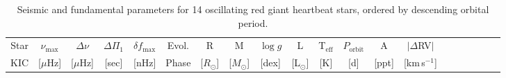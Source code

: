\begin{landscape}
\begin{table}[tp!]
\caption{
Seismic and fundamental parameters for 14 oscillating red giant heartbeat stars, ordered by descending orbital period.}
\tabcolsep=5pt
\hfill\begin{tabular}{c|rrrrrrrrrrrrrrrrrrr}
\hline \hline
\multicolumn{1}{c}{Star}  & \multicolumn{1}{c}{$\nu_{\mathrm{max}}$}  & 
\multicolumn{1}{c}{$\Delta\nu$}  & \multicolumn{1}{c}{$\Delta\Pi_1$}  & 
\multicolumn{1}{c}{$\delta f_{\mathrm{max}}$} &  \multicolumn{1}{c}{Evol.}  & 
\multicolumn{1}{c}{R}  & 
\multicolumn{1}{c}{M}  & 
\multicolumn{1}{c}{$\log g$} & 
\multicolumn{1}{c}{L}  & 
\multicolumn{1}{c}{T$_{\mathrm{eff}}$} & 
\multicolumn{1}{c}{$P_{\mathrm{orbit}}$} & 
\multicolumn{1}{c}{A}  & 
\multicolumn{1}{c}{$| \Delta $RV$|$} 	 \\
\multicolumn{1}{c}{KIC}  & 
\multicolumn{1}{c}{ [$\mu$Hz]} & 
\multicolumn{1}{c}{ [$\mu$Hz]} & 
\multicolumn{1}{c}{ [sec]} & 
\multicolumn{1}{c}{ [nHz]} & 
\multicolumn{1}{c}{Phase}  & 
\multicolumn{1}{c}{ [$R_\odot$]} & 
\multicolumn{1}{c}{ [$M_\odot$]} & 
\multicolumn{1}{c}{ [dex]} & 
\multicolumn{1}{c}{ [L$_\odot$]} & 
\multicolumn{1}{c}{ [K]} & 
\multicolumn{1}{c}{ [d]} & 
\multicolumn{1}{c}{ [ppt]} & 
\multicolumn{1}{c}{ [km\,s$^{-1}$]}
\\\hline


\end{tabular}
\end{table}
\end{landscape}
